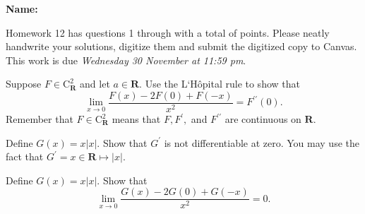 \documentclass[12pt,fleqn]{exam}
\newcommand{\reals}{\mathbf{R}}
\newcommand\PM{{\sc pm}}
\newcommand{\quiz}{12}
\newcommand{\term}{Fall}
\newcommand{\due}{Wednesday 30 November at 11:59 \PM}
\begin{document}
\large
\vspace{0.1in}
\noindent{}
{\bf Name:}  \\
\noindent \makebox[3.0truein][l]{\bf Homework \quiz, \term \/ \the\year}
\vspace{0.1in}

\begin{quote}
    \end{quote}
\noindent  Homework    \quiz\/  has questions 1 through  \numquestions \/ with 
a total of  \numpoints\/  points.  Please neatly handwrite your solutions, digitize them and
submit the digitized copy to Canvas. This work is due \emph{\due}.

\vspace{0.1in}


\begin{questions} 

\question [5] Suppose $F \in \mathrm{C}^2_\reals$ and let $a \in \reals$. Use the L`H\^opital rule to show that
\begin{equation*}
 \lim_{x \to 0} \frac{F(x) - 2 F(0) + F(-x)}{x^2} = F^{\prime\prime}(0).
 \end{equation*}
 Remember that $F \in \mathrm{C}^2_\reals$ means that $F,F^\prime,$ and $F^{\prime\prime}$ are continuous on $\reals$.
 

 \question[5] Define $G(x) = x |x|$. Show that $G^\prime$ is not differentiable at zero. You may use the
 fact that $G^\prime = x \in \reals \mapsto |x|$.
  
 
 \question[5] Define $G(x) = x |x|$. Show that
 \begin{equation*}
 \lim_{x \to 0} \frac{G(x) - 2 G(0) + G(-x)}{x^2}  = 0.
 \end{equation*}
\end{questions}
\end{document}
